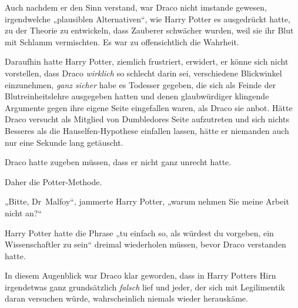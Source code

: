 Auch nachdem er den Sinn verstand, war Draco nicht imstande gewesen, irgendwelche „plausiblen Alternativen“, wie Harry Potter es ausgedrückt hatte, zu der Theorie zu entwickeln, dass Zauberer schwächer wurden, weil sie ihr Blut mit Schlamm vermischten. Es war zu offensichtlich die Wahrheit.

Daraufhin hatte Harry Potter, ziemlich frustriert, erwidert, er könne sich nicht vorstellen, dass Draco \emph{wirklich} so schlecht darin sei, verschiedene Blickwinkel einzunehmen, \emph{ganz sicher} habe es Todesser gegeben, die sich als Feinde der Blutreinheitslehre ausgegeben hatten und denen glaubwürdiger klingende Argumente gegen ihre eigene Seite eingefallen waren, als Draco sie anbot. Hätte Draco versucht als Mitglied von Dumbledores Seite aufzutreten und sich nichts Besseres als die Hauselfen-Hypothese einfallen lassen, hätte er niemanden auch nur eine Sekunde lang getäuscht.

Draco hatte zugeben müssen, dass er nicht ganz unrecht hatte.

Daher die Potter-Methode.

„Bitte, Dr~Malfoy“, jammerte Harry Potter, „warum nehmen Sie meine Arbeit nicht an?“

Harry Potter hatte die Phrase „tu einfach so, als würdest du vorgeben, ein Wissenschaftler zu sein“ dreimal wiederholen müssen, bevor Draco verstanden hatte.

In diesem Augenblick war Draco klar geworden, dass in Harry Potters Hirn irgendetwas ganz grundsätzlich \emph{falsch} lief und jeder, der sich mit Legilimentik daran versuchen würde, wahrscheinlich niemals wieder herauskäme.

